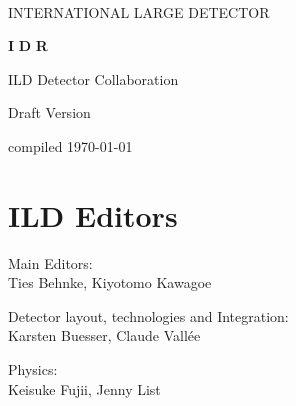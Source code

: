 %
%
\begin{titlepage}
\begin{center}
~
 ~\vskip 4cm

    {\huge  INTERNATIONAL} 
    {\huge  LARGE} 
    {\huge  DETECTOR}
    
  \vskip 1.2cm

    {\huge \bfseries I}
    {\huge \bfseries D}
    {\huge \bfseries R}

  \vskip 1.2cm




{\huge ILD Detector Collaboration} \\
    

\author{Contact:  Behnke, Deutsches Elektronen Synchroton, DESY}


  \vskip 3cm

{\huge }


    {\huge Draft Version}\\
    
  \vskip 1cm
    
    {\huge compiled \today}

\end{center}



\end{titlepage}

\newpage\thispagestyle{empty}
\cleardoublepage


\chapter*{ILD Editors}
\noindent Main Editors:\\
Ties Behnke, Kiyotomo Kawagoe

\vspace*{2mm}

\noindent Detector layout, technologies and Integration:\\
Karsten Buesser, Claude Vall\'ee

\vspace*{2mm}
\noindent Physics:\\
Keisuke Fujii, Jenny List

